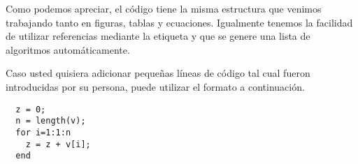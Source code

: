 Como podemos apreciar, el código tiene la misma estructura que venimos trabajando tanto en figuras, tablas y ecuaciones. Igualmente tenemos la facilidad de utilizar referencias mediante la etiqueta y que se genere una lista de algoritmos automáticamente. 

Caso usted quisiera adicionar pequeñas líneas de código tal cual fueron introducidas por su persona, puede utilizar el formato a continuación.

\begin{lstlisting}[frame=single]
  % suma de los elementos de un vector
  z = 0;
  n = length(v);
  for i=1:1:n
    z = z + v[i];
  end
\end{lstlisting}